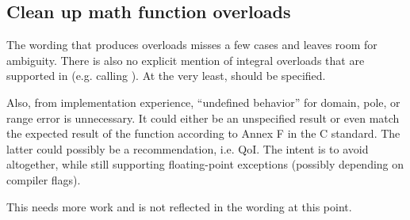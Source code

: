 \subsection{Clean up math function overloads}
The wording that produces  overloads misses a few cases and leaves room for ambiguity.
There is also no explicit mention of integral overloads that are supported in  (e.g.  calling ).
At the very least,  should be specified.

Also, from implementation experience, ``undefined behavior'' for domain, pole,
or range error is unnecessary.
It could either be an unspecified result or even match the expected result of
the function according to Annex F in the C standard.
The latter could possibly be a recommendation, i.e. QoI.
The intent is to avoid  altogether, while still supporting
floating-point exceptions (possibly depending on compiler flags).

This needs more work and is not reflected in the wording at this point.

